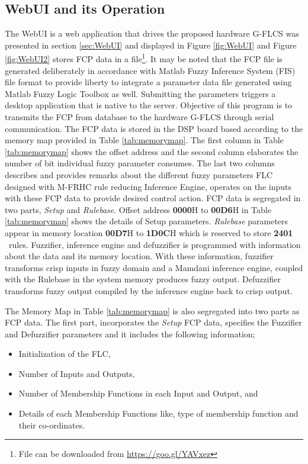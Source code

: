 \subsection{WebUI and its Operation}
The WebUI is a web application that drives the proposed hardware G\hyp{}FLCS was presented in section \ref{sec:WebUI} and displayed in Figure \ref{fig:WebUI} and Figure \ref{fig:WebUI2} stores FCP data in a file\footnote{File can be downloaded from \url{https://goo.gl/YAVxez}}. It may be noted that the FCP file is generated deliberately in accordance with Matlab Fuzzy Inference System (FIS) file format to provide liberty to integrate a parameter data file generated using Matlab Fuzzy Logic Toolbox as well. Submitting the parameters triggers a desktop application that is native to the server. Objective of this program is to transmits the FCP from database to the hardware G\hyp{}FLCS through serial communication. The FCP data is stored in the DSP board based according to the memory map provided in Table \ref{tab:memorymap}. The first column in Table \ref{tab:memorymap} shows the offset address and the second column elaborates the number of bit individual fuzzy parameter consumes. The last two columns describes and provides remarks about the different fuzzy parameters FLC designed with M\hyp{}FRHC rule reducing Inference Engine, operates on the inputs with these FCP data to provide desired control action. FCP data is segregated in two parts, \textit{Setup} and \textit{Rulebase}. Offset address \textbf{0000}H to \textbf{00D6}H in Table \ref{tab:memorymap} shows the details of Setup parameters. \textit{Rulebase} parameters appear in memory location \textbf{00D7}H to \textbf{1D0C}H which is reserved to store \textbf{{2401}} ~rules. Fuzzifier, inference engine and defuzzifier is programmed with information about the data and its memory location. With these information, fuzzifier transforms crisp inputs in fuzzy domain and a Mamdani inference engine, coupled with the Rulebase in the system memory produces fuzzy output. Defuzzifier transforms fuzzy output compiled by the inference engine back to crisp output.

The Memory Map in Table \ref{tab:memorymap} is also segregated into two parts as FCP data. The first part, incorporates the \textit{Setup} FCP data, specifies the Fuzzifier and Defuzzifier parameters and it includes the following information;
\begin{itemize}
	\item Initialization of the FLC,
	\item Number of Inputs and Outputs,
	\item Number of Membership Functions in each Input and Output, and
	\item Details of each Membership Functions like, type of membership function and their co-ordinates.
\end{itemize}

